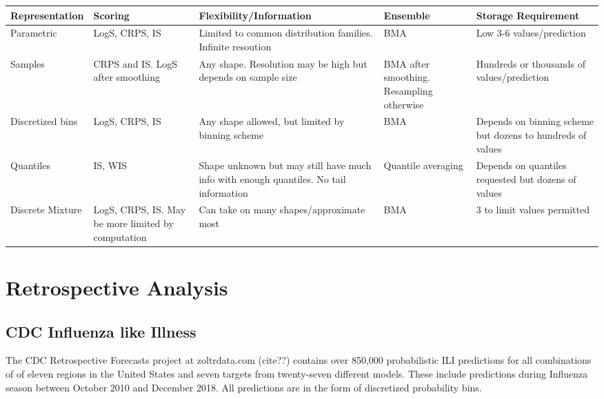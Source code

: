 \documentclass{article}\usepackage[]{graphicx}\usepackage[]{color}
\begin{document}
\begin{flushleft}
    \begin{adjustwidth}{-3cm}{-1cm}
    \begin{tabular}{ | p{2.4cm} | p{3cm} | p{4cm} | p{3cm} | p{3.5cm} |}
    \hline
    Representation & Scoring & Flexibility/Information & Ensemble &
    Storage Requirement
    \\ \hline

    Parametric & LogS, CRPS, IS & Limited to common distribution families. 
    Infinite resoution
    & BMA & Low 3-6 values/prediction \\ \hline
    
    Samples & CRPS and IS. LogS after smoothing & Any shape. Resolution may be
    high but depends on sample size & BMA after smoothing. Resampling otherwise& 
    Hundreds or thousands of values/prediction
    \\ \hline
    
    Discretized bins & LogS, CRPS, IS &
    Any shape allowed, but limited by binning scheme & BMA &
    Depends on binning scheme but dozens to hundreds of values
    \\ \hline


    Quantiles & IS, WIS & Shape unknown but may still have much info with 
    enough quantiles. No tail information & Quantile averaging & Depends on 
    quantiles requested but dozens of values
    \\ \hline
    
    Discrete Mixture & LogS, CRPS, IS. May be more limited by computation & Can
    take on many shapes/approximate most & BMA 
    & 3 to limit values permitted
    \\ \hline

	 \end{tabular}
	 \end{adjustwidth}
\end{flushleft}


\newpage


\section{Retrospective Analysis}

\subsection{CDC Influenza like Illness}
The CDC Retrospective Forecasts project at zoltrdata.com (cite??) contains over
850,000 probabilistic ILI predictions for all combinations of of eleven regions 
in the United States and seven targets from twenty-seven different models. These
include predictions during Influenza season between October 2010 and December
2018. All predictions are in the form of discretized probability bins. 
\end{document}
